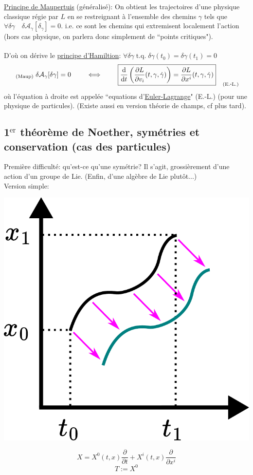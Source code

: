 \documentclass[a4paper,11pt]{article}
\renewcommand{\d}{{\mathrm{d}}}
\newcommand{\dr}[2]{\frac{\partial {#1}}{\partial{#2}}}
\begin{document}
\underline{Principe de Maupertuis} (généralisé): On obtient les trajectoires d'une physique classique régie par $L$ en se restreignant à l'ensemble des chemins $\gamma$ tels que $\forall \delta \gamma \quad \delta\mathcal{A}_\gamma[\delta_\gamma]=0$. i.e. ce sont les chemins qui extremisent localement l'action (hors cas physique, on parlera donc simplement de ``points critiques").\\ \\
D'où on dérive le \underline{principe d'Hamiltion}: 
$\forall \delta\gamma \; \mathrm{t}.\mathrm{q}.\; \delta\gamma(t_0)=\delta\gamma(t_1)=0$
\begin{equation*}
\;_{(\mathrm{Maup})} \; \delta\mathcal{A}_\gamma[\delta\gamma] = 0 \quad \quad \iff \quad \quad \boxed{\frac{\d}{\d t}\left(\dr{L}{v_i}(t,\gamma,\dot\gamma)\right) = \dr{L}{x^i}(t,\gamma,\dot\gamma)}_{\quad(\mathrm{E}.\scalebox{0.75}[1.0]{-}\mathrm{L}.)}
\end{equation*}
où l'équation à droite est appelée ``equations d'\underline{Euler-Lagrange}" (E.-L.) (pour une physique de particules). (Existe aussi en version théorie de champs, cf plus tard).

\subsection{1$^\mathrm{er}$ théorème de Noether, symétries et conservation (cas des particules)}
Première difficulté: qu'est-ce qu'une symétrie? Il s'agit, grossièrement d'une action d'un groupe de Lie. (Enfin, d'une algèbre de Lie plutôt...)\\
Version simple:\\
\begin{minipage}{.5\textwidth}
\centering
\includegraphics[width=.5\textwidth]{Drawings/Draw_1.pdf}
\end{minipage}
\begin{minipage}{.5\textwidth}
\centering
$$X = X^0(t,x)\frac{\partial}{\partial t} + X^i(t,x) \frac{\partial}{\partial x^i}$$
$$T:=X^0$$
\end{minipage}
\end{document}
